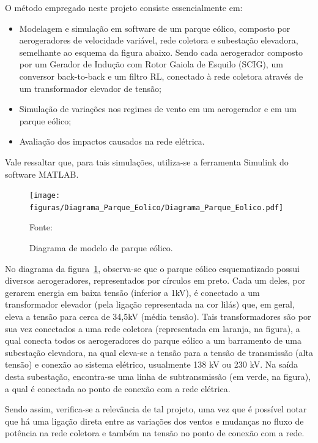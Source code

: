 O método empregado neste projeto consiste essencialmente em:
\begin{itemize}
\item Modelagem e simulação em software de um parque eólico, composto por aerogeradores de velocidade variável, rede coletora e subestação elevadora, semelhante ao esquema da figura abaixo. Sendo cada aerogerador composto por um Gerador de Indução com Rotor Gaiola de Esquilo (\ac{SCIG}), um conversor back-to-back e um filtro RL, conectado à rede coletora através de um transformador elevador de tensão;
\item Simulação de variações nos regimes de vento em um aerogerador e em um parque eólico;
\item Avaliação dos impactos causados na rede elétrica.
\end{itemize}

Vale ressaltar que, para tais simulações, utiliza-se a ferramenta Simulink do software MATLAB.


\begin{figure}[htb]
	\caption{Diagrama de modelo de parque eólico.}
	\begin{center}
	    \texttt{[image: figuras/Diagrama\_Parque\_Eolico/Diagrama\_Parque\_Eolico.pdf]} 
	\end{center}
   \begin{center}
   \footnotesize {Fonte: }
   \end{center}
    \label{fig:parqueeolico}
\end{figure}


No diagrama da figura~\ref{fig:parqueeolico}, observa-se que o parque eólico esquematizado possui diversos aerogeradores, representados por círculos em preto. Cada um deles, por gerarem energia em baixa tensão (inferior a 1kV), é conectado a um transformador elevador (pela ligação representada na cor lilás) que, em geral, eleva a tensão para cerca de 34,5kV (média tensão). Tais transformadores são por sua vez conectados a uma rede coletora (representada em laranja, na figura), a qual conecta todos os aerogeradores do parque eólico a um barramento de uma subestação elevadora, na qual eleva-se a tensão para a tensão de transmissão (alta tensão) e conexão ao sistema elétrico, usualmente 138 kV ou 230 kV. Na saída desta subestação, encontra-se uma linha de subtransmissão (em verde, na figura), a qual é conectada ao ponto de conexão com a rede elétrica.

Sendo assim, verifica-se a relevância de tal projeto, uma vez que é possível notar que há uma ligação direta entre as variações dos ventos e mudanças no fluxo de potência na rede coletora e também na tensão no ponto de conexão com a rede.


